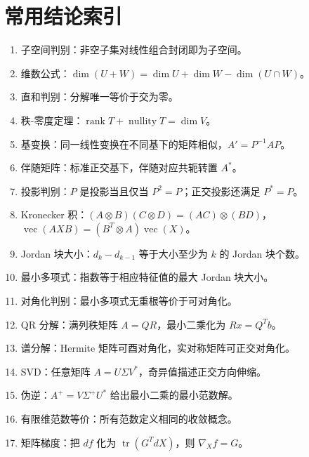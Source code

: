 \documentclass[UTF8,openany,zihao=-4]{ctexbook}
\theoremstyle{cnplain}
\newcommand{\rank}{\operatorname{rank}}
\newcommand{\tr}{\operatorname{tr}}
\newcommand{\nullity}{\operatorname{nullity}}
\newcommand{\vect}{\operatorname{vec}}
\begin{document}
\backmatter

\chapter*{常用结论索引}

\begin{enumerate}
  \item 子空间判别：非空子集对线性组合封闭即为子空间。
  \item 维数公式：$\dim(U+W)=\dim U+\dim W-\dim(U\cap W)$。
  \item 直和判别：分解唯一等价于交为零。
  \item 秩-零度定理：$\rank T+\nullity T=\dim V$。
  \item 基变换：同一线性变换在不同基下的矩阵相似，$A'=P^{-1}AP$。
  \item 伴随矩阵：标准正交基下，伴随对应共轭转置 $A^*$。
  \item 投影判别：$P$ 是投影当且仅当 $P^2=P$；正交投影还满足 $P^*=P$。
  \item Kronecker 积：$(A\otimes B)(C\otimes D)=(AC)\otimes(BD)$，$\vect(AXB)=(B^T\otimes A)\vect(X)$。
  \item Jordan 块大小：$d_k-d_{k-1}$ 等于大小至少为 $k$ 的 Jordan 块个数。
  \item 最小多项式：指数等于相应特征值的最大 Jordan 块大小。
  \item 对角化判别：最小多项式无重根等价于可对角化。
  \item QR 分解：满列秩矩阵 $A=QR$，最小二乘化为 $Rx=Q^Tb$。
  \item 谱分解：Hermite 矩阵可酉对角化，实对称矩阵可正交对角化。
  \item SVD：任意矩阵 $A=U\Sigma V^*$，奇异值描述正交方向伸缩。
  \item 伪逆：$A^+=V\Sigma^+U^*$ 给出最小二乘的最小范数解。
  \item 有限维范数等价：所有范数定义相同的收敛概念。
  \item 矩阵梯度：把 $df$ 化为 $\tr(G^T dX)$，则 $\nabla_X f=G$。
\end{enumerate}
\end{document}
